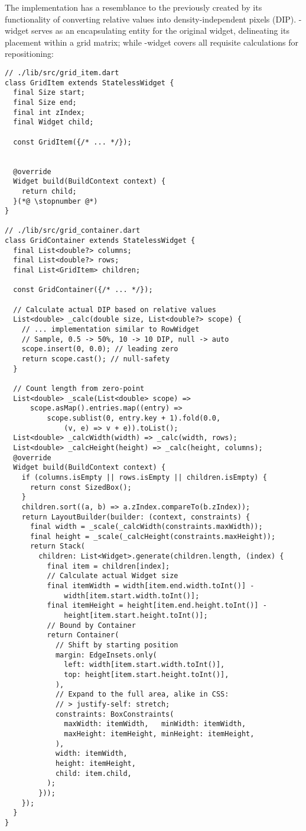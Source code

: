\noindent The implementation has a resemblance to the previously created  by its functionality of 
converting relative values into density-independent pixels (DIP). -widget serves as an encapsulating 
entity for the original widget, delineating its placement within a grid matrix; while -widget covers
all requisite calculations for repositioning:

\begin{lstlisting}
// ./lib/src/grid_item.dart
class GridItem extends StatelessWidget {
  final Size start;
  final Size end;
  final int zIndex;
  final Widget child;

  const GridItem({/* ... */});


  @override
  Widget build(BuildContext context) {
    return child;
  }(*@ \stopnumber @*)
}

// ./lib/src/grid_container.dart
class GridContainer extends StatelessWidget {
  final List<double?> columns;
  final List<double?> rows;
  final List<GridItem> children;

  const GridContainer({/* ... */});

  // Calculate actual DIP based on relative values
  List<double> _calc(double size, List<double?> scope) {
    // ... implementation similar to RowWidget
    // Sample, 0.5 -> 50%, 10 -> 10 DIP, null -> auto
    scope.insert(0, 0.0); // leading zero
    return scope.cast(); // null-safety
  }

  // Count length from zero-point
  List<double> _scale(List<double> scope) =>
      scope.asMap().entries.map((entry) => 
          scope.sublist(0, entry.key + 1).fold(0.0, 
              (v, e) => v + e)).toList();
  List<double> _calcWidth(width) => _calc(width, rows);
  List<double> _calcHeight(height) => _calc(height, columns);
  @override
  Widget build(BuildContext context) {
    if (columns.isEmpty || rows.isEmpty || children.isEmpty) {
      return const SizedBox();
    }
    children.sort((a, b) => a.zIndex.compareTo(b.zIndex));
    return LayoutBuilder(builder: (context, constraints) {
      final width = _scale(_calcWidth(constraints.maxWidth));
      final height = _scale(_calcHeight(constraints.maxHeight));
      return Stack(
        children: List<Widget>.generate(children.length, (index) {
          final item = children[index];
          // Calculate actual Widget size
          final itemWidth = width[item.end.width.toInt()] - 
              width[item.start.width.toInt()];
          final itemHeight = height[item.end.height.toInt()] - 
              height[item.start.height.toInt()];
          // Bound by Container
          return Container(
            // Shift by starting position
            margin: EdgeInsets.only(
              left: width[item.start.width.toInt()],
              top: height[item.start.height.toInt()],
            ),
            // Expand to the full area, alike in CSS:
            // > justify-self: stretch;
            constraints: BoxConstraints(
              maxWidth: itemWidth,   minWidth: itemWidth,
              maxHeight: itemHeight, minHeight: itemHeight,
            ),
            width: itemWidth,
            height: itemHeight,
            child: item.child,
          );
        }));
    });
  }
}
\end{lstlisting}

